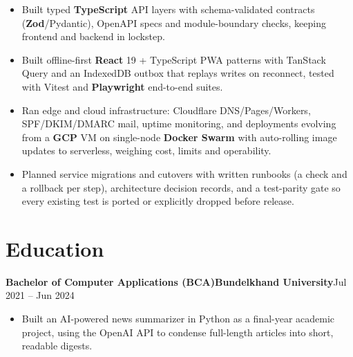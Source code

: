 \documentclass[11pt,a4paper]{article}
\newcommand{\entry}[3]{%
  \vspace{4.5pt}\noindent\textbf{#1}\hfill\textbf{#2}\hfill{\color{subtlegray}#3}\par\vspace{2pt}}
\begin{document}
\begin{itemize}
        Prometheus/Grafana/Loki/Tempo stack, so failures across services could be
        traced to a single request.
  \item Built typed \textbf{TypeScript} API layers with schema-validated
        contracts (\textbf{Zod}/Pydantic), OpenAPI specs and module-boundary
        checks, keeping frontend and backend in lockstep.
  \item Built offline-first \textbf{React} 19 + TypeScript PWA
        patterns with TanStack Query and an IndexedDB outbox that replays writes
        on reconnect, tested with Vitest and \textbf{Playwright} end-to-end suites.
  \item Ran edge and cloud infrastructure: Cloudflare DNS/Pages/Workers,
        SPF/DKIM/DMARC mail, uptime monitoring, and deployments evolving from a
        \textbf{GCP} VM on single-node \textbf{Docker Swarm} with auto-rolling
        image updates to serverless, weighing cost, limits and operability.
  \item Planned service migrations and cutovers with written runbooks (a check
        and a rollback per step), architecture decision records, and a test-parity
        gate so every existing test is ported or explicitly dropped before release.
\end{itemize}

\section{Education}
\entry{Bachelor of Computer Applications (BCA)}{Bundelkhand University}{Jul 2021 -- Jun 2024}
\begin{itemize}
  \item Built an AI-powered news summarizer in Python as a final-year academic
        project, using the OpenAI API to condense full-length articles into short,
        readable digests.
\end{itemize}

\end{document}
